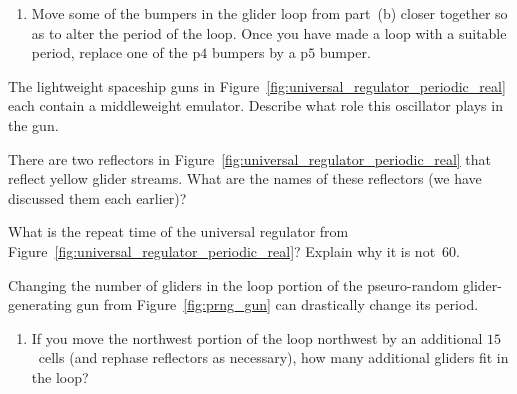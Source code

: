 \begin{multicols}{2}
\begin{problemstar}
\begin{enumerate}[label=\bf\color{ocre}(\alph*)]
			\item {} Move some of the bumpers in the glider loop from part~(b) closer together so as to alter the period of the loop. Once you have made a loop with a suitable period, replace one of the p$4$ bumpers by a p$5$ bumper.
			
			\noindent\begin{center}
			\end{center}
		\end{enumerate}
	\end{problemstar}
	
	
	\mfilbreak
	
	
	\begin{problemstar}\label{exer:p60_regulator_mwss_emulator} 
		The lightweight spaceship guns in Figure~\ref{fig:universal_regulator_periodic_real} each contain a middleweight emulator. Describe what role this oscillator plays in the gun.
	\end{problemstar}
	
	
	\mfilbreak
	
	
	\begin{problem}\label{exer:p60_regulator_reflectors} 
		There are two reflectors in Figure~\ref{fig:universal_regulator_periodic_real} that reflect yellow glider streams. What are the names of these reflectors (we have discussed them each earlier)?
	\end{problem}


	\mfilbreak
	
	
	\begin{problem}\label{exer:universal_regulator_repeat_time} 
		What is the repeat time of the universal regulator from Figure~\ref{fig:universal_regulator_periodic_real}? Explain why it is not~$60$.
	\end{problem}
	
	
	\mfilbreak
	
	
	\begin{problemstar}\label{exer:prng_gun}
		Changing the number of gliders in the loop portion of the pseuro-random glider-generating gun from Figure~\ref{fig:prng_gun} can drastically change its period.\smallskip
		
		\begin{enumerate}[label=\bf\color{ocre}(\alph*)]
			\item {} If you move the northwest portion of the loop northwest by an additional $15$~cells (and rephase reflectors as necessary), how many additional gliders fit in the loop?
			

\end{enumerate}
\end{problemstar}
\end{multicols}
